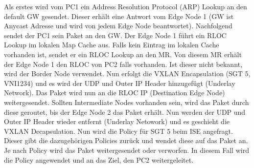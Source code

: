 Als erstes wird vom PC1 ein Address Resolution Protocol (ARP) Lookup an den default GW gesendet. Dieser erhält eine Antwort vom Edge Node 1 (GW ist Anycast Adresse und wird von jedem Edge Node beantwortet). Nachfolgend sendet der PC1 sein Paket an den GW. Der Edge Node 1 führt ein RLOC Lookup im lokalen Map Cache aus. Falls kein Eintrag im lokalen Cache vorhanden ist, sendet er ein RLOC Lookup an den MR. Von diesem MR erhält der Edge Node 1 den RLOC von PC2 falls vorhanden. Ist dieser nicht bekannt, wird der Border Node verwendet. Nun erfolgt die VXLAN Encapsulation (SGT 5, VNI1234) und es wird der UDP und Outer IP Header hinzugefügt (Underlay Network). Das Paket wird nun an die RLOC IP (Destination Edge Node) weitergesendet. Sollten Intermediate Nodes vorhanden sein, wird das Paket durch diese geroutet, bis der Edge Node 2 das Paket erhält. Nun werden der UDP und Outer IP Header wieder entfernt (Underlay Netowork) und es geschieht die VXLAN Decapsulation. Nun wird die Policy für SGT 5 beim ISE angefragt. Dieser gibt die dazugehörigen Policies zurück und wendet diese auf das Paket an. Je nach Policy wird das Paket weitergesendet oder verworfen. In diesem Fall wird die Policy angewendet und an das Ziel, den PC2 weitergeleitet.




